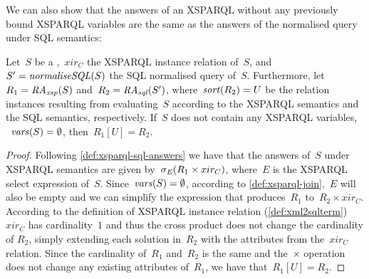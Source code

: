 We can also show that the answers of an XSPARQL \SQLForClause without any previously bound XSPARQL variables are the
same as the answers of the normalised query under \ac{SQL} semantics:
%
\begin{lemma}
  \label{lemma:xsparql-relation-instance}
  Let~$S$ be a \SQLForClause,~$xir_C$ the XSPARQL instance relation of~$S$, and~$S' = \mathit{normaliseSQL}\!\left(S\right)$ the
  \ac{SQL} normalised query of~$S$. 
  Furthermore, let~$R_1 = \mathit{RA_{\mathit{xsp}}}\!\left(S\right)$ and~$R_2 = \mathit{RA_{\mathit{sql}}}\!\left(S'\right)$, where~$\mathit{sort}\!\left(R_2\right) = U$ be the relation instances
  resulting from evaluating~$S$ according to the XSPARQL semantics and the \ac{SQL} semantics, respectively.
  If~$S$ does not contain any XSPARQL variables, \ie~$\mathit{vars}\!\left(S\right) = \emptyset$, then~$R_1[U] =
  R_2$.
\end{lemma}
%
\begin{proof}
  Following \cref{def:xsparql-sql-answers} we have that the answers of~$S$ under XSPARQL semantics are given
  by~$\mathit{\sigma_{E}}\!\left(R_1 \times xir_C\right)$, where~$E$ is the XSPARQL select expression of~$S$.  
  Since~$\mathit{vars}\!\left(S\right) = \emptyset$, according to \cref{def:xsparql-join},~$E$ will also be empty and we can
  simplify the expression that produces~$R_1$ to~$R_2 \times xir_C$.
  According to the definition of XSPARQL instance relation (\cref{def:xml2sqlterm})~$xir_C$ has
  cardinality~$1$ and thus the cross product does not change the cardinality of $R_2$, simply extending each solution
  in~$R_2$ with the attributes from the~$xir_C$ relation.  
  Since the cardinality of~$R_1$ and~$R_2$ is the same and the~$\times$ operation does not change any existing
  attributes of~$R_1$, we have that~$R_1[U] = R_2$.
\end{proof}

